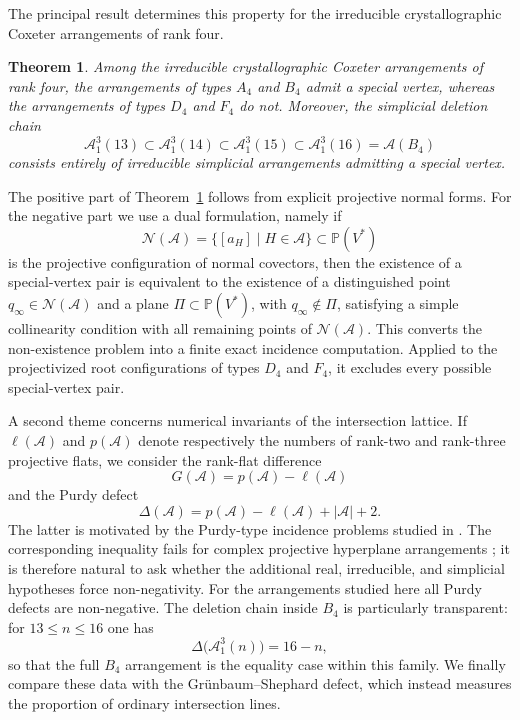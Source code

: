 \documentclass[11pt]{article}
\newtheorem{theorem}{Theorem}[section]
\theoremstyle{definition}
\theoremstyle{remark}
\newcommand{\PP}{\mathbb P}
\newcommand{\cA}{\mathcal A}
\newcommand{\cN}{\mathcal N}
\newcommand{\card}[1]{\lvert #1\rvert}
\begin{document}
The principal result determines this property for the irreducible
crystallographic Coxeter arrangements of rank four.

\begin{theorem}\label{thm:main-special-vertex}
Among the irreducible crystallographic Coxeter arrangements of rank four,
the arrangements of types $A_4$ and $B_4$ admit a special vertex, whereas
the arrangements of types $D_4$ and $F_4$ do not.  Moreover, the simplicial
deletion chain
\[
 \cA^3_1(13)\subset
 \cA^3_1(14)\subset
 \cA^3_1(15)\subset
 \cA^3_1(16)=\cA(B_4)
\]
consists entirely of irreducible simplicial arrangements admitting a
special vertex.
\end{theorem}

The positive part of Theorem~\ref{thm:main-special-vertex} follows from
explicit projective normal forms.  For the negative part we use a dual
formulation, namely if
\[
 \cN(\cA)=\{[a_H]\mid H\in\cA\}\subset\PP(V^*)
\]
is the projective configuration of normal covectors, then the existence of
a special-vertex pair is equivalent to the existence of a distinguished
point $q_\infty\in\cN(\cA)$ and a plane $\Pi\subset\PP(V^*)$, with
$q_\infty\notin\Pi$, satisfying a simple collinearity condition with all
remaining points of $\cN(\cA)$.  This converts the non-existence problem
into a finite exact incidence computation.  Applied to the projectivized
root configurations of types $D_4$ and $F_4$, it excludes every possible
special-vertex pair.

A second theme concerns numerical invariants of the intersection lattice.
If $\ell(\cA)$ and $p(\cA)$ denote respectively the numbers of rank-two
and rank-three projective flats, we consider the rank-flat difference
\[
 G(\cA)=p(\cA)-\ell(\cA)
\]
and the Purdy defect
\[
 \Delta(\cA)=p(\cA)-\ell(\cA)+\card{\cA}+2.
\]
The latter is motivated by the Purdy-type incidence problems studied in
\cite{Purdy1981, Purdy1986}.  The corresponding inequality fails for complex projective
hyperplane arrangements \cite{MMPP}; it is therefore natural to ask
whether the additional real, irreducible, and simplicial hypotheses force
non-negativity.  For the arrangements studied here all Purdy defects are
non-negative.  The deletion chain inside $B_4$ is particularly
transparent: for $13\leq n\leq16$ one has
\[
 \Delta\bigl(\cA^3_1(n)\bigr)=16-n,
\]
so that the full $B_4$ arrangement is the equality case within this
family.  We finally compare these data with the Gr\"unbaum--Shephard
defect, which instead measures the proportion of ordinary intersection
lines.
\end{document}
